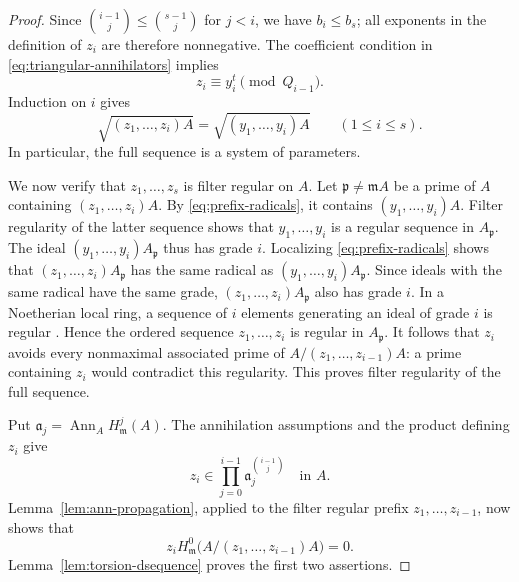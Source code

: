 \documentclass[11pt,reqno]{amsart}
\numberwithin{equation}{section}
\theoremstyle{definition}
\newcommand{\m}{\mathfrak m}
\begin{document}
\begin{proof}
Since $\binom{i-1}{j}\le\binom{s-1}{j}$ for $j<i$, we have $b_i\le b_s$;
all exponents in the definition of $z_i$ are therefore nonnegative.
The coefficient condition in \eqref{eq:triangular-annihilators} implies
\begin{equation}\label{eq:triangular-prefix}
 z_i\equiv y_i^t\pmod{Q_{i-1}}.
\end{equation}
Induction on $i$ gives
\begin{equation}\label{eq:prefix-radicals}
 \sqrt{(z_1,\ldots,z_i)A}=\sqrt{(y_1,\ldots,y_i)A}
 \qquad(1\le i\le s).
\end{equation}
In particular, the full sequence is a system of parameters.

We now verify that $z_1,\ldots,z_s$ is filter regular on $A$.
Let $\mathfrak p\ne\m A$ be a prime of $A$
containing $(z_1,\ldots,z_i)A$.  By \eqref{eq:prefix-radicals}, it
contains $(y_1,\ldots,y_i)A$.  Filter regularity of the latter sequence
shows that $y_1,\ldots,y_i$ is a regular sequence in $A_{\mathfrak p}$.
The ideal $(y_1,\ldots,y_i)A_{\mathfrak p}$ thus has grade $i$.
Localizing \eqref{eq:prefix-radicals} shows that
$(z_1,\ldots,z_i)A_{\mathfrak p}$ has the same radical as
$(y_1,\ldots,y_i)A_{\mathfrak p}$. Since ideals with the same radical have the same grade,
$(z_1,\ldots,z_i)A_{\mathfrak p}$ also has grade $i$.
In a Noetherian local ring, a sequence of $i$ elements generating an
ideal of grade $i$ is regular
\cite[Theorems~16.5(ii) and~16.8]{Matsumura1989}. Hence the ordered
sequence $z_1,\ldots,z_i$ is regular in $A_{\mathfrak p}$.
It follows that $z_i$ avoids every nonmaximal associated prime of
$A/(z_1,\ldots,z_{i-1})A$: a prime containing $z_i$ would contradict
this regularity.
This proves filter regularity of the full sequence.

Put $\mathfrak a_j=\operatorname{Ann}_A H^j_{\m}(A)$.
The annihilation assumptions and the product defining $z_i$ give
\[
 z_i\in\prod_{j=0}^{i-1}\mathfrak a_j^{\binom{i-1}{j}}
 \quad\text{in }A.
\]
Lemma~\ref{lem:ann-propagation}, applied to the filter regular prefix
$z_1,\ldots,z_{i-1}$, now shows that
\[
 z_iH^0_{\m}\bigl(A/(z_1,\ldots,z_{i-1})A\bigr)=0.
\]
Lemma~\ref{lem:torsion-dsequence} proves the first two assertions.


\end{proof}
\end{document}
